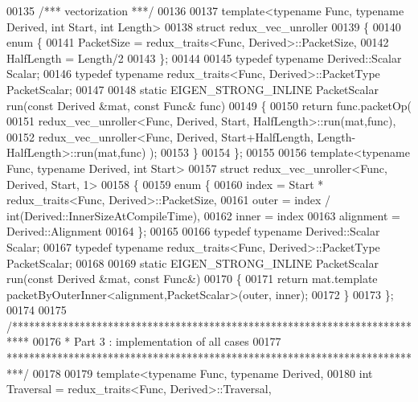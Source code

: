 \begin{DoxyCode}
00135 \textcolor{comment}{/*** vectorization ***/}
00136 
00137 \textcolor{keyword}{template}<\textcolor{keyword}{typename} Func, \textcolor{keyword}{typename} Derived, \textcolor{keywordtype}{int} Start, \textcolor{keywordtype}{int} Length>
00138 \textcolor{keyword}{struct }redux\_vec\_unroller
00139 \{
00140   \textcolor{keyword}{enum} \{
00141     PacketSize = redux\_traits<Func, Derived>::PacketSize,
00142     HalfLength = Length/2
00143   \};
00144 
00145   \textcolor{keyword}{typedef} \textcolor{keyword}{typename} Derived::Scalar Scalar;
00146   \textcolor{keyword}{typedef} \textcolor{keyword}{typename} redux\_traits<Func, Derived>::PacketType PacketScalar;
00147 
00148   \textcolor{keyword}{static} EIGEN\_STRONG\_INLINE PacketScalar run(\textcolor{keyword}{const} Derived &mat, \textcolor{keyword}{const} Func& func)
00149   \{
00150     \textcolor{keywordflow}{return} func.packetOp(
00151             redux\_vec\_unroller<Func, Derived, Start, HalfLength>::run(mat,func),
00152             redux\_vec\_unroller<Func, Derived, Start+HalfLength, Length-HalfLength>::run(mat,func) );
00153   \}
00154 \};
00155 
00156 \textcolor{keyword}{template}<\textcolor{keyword}{typename} Func, \textcolor{keyword}{typename} Derived, \textcolor{keywordtype}{int} Start>
00157 \textcolor{keyword}{struct }redux\_vec\_unroller<Func, Derived, Start, 1>
00158 \{
00159   \textcolor{keyword}{enum} \{
00160     index = Start * redux\_traits<Func, Derived>::PacketSize,
00161     outer = index / int(Derived::InnerSizeAtCompileTime),
00162     inner = index %
00163     alignment = Derived::Alignment
00164   \};
00165 
00166   \textcolor{keyword}{typedef} \textcolor{keyword}{typename} Derived::Scalar Scalar;
00167   \textcolor{keyword}{typedef} \textcolor{keyword}{typename} redux\_traits<Func, Derived>::PacketType PacketScalar;
00168 
00169   \textcolor{keyword}{static} EIGEN\_STRONG\_INLINE PacketScalar run(\textcolor{keyword}{const} Derived &mat, \textcolor{keyword}{const} Func&)
00170   \{
00171     \textcolor{keywordflow}{return} mat.template packetByOuterInner<alignment,PacketScalar>(outer, inner);
00172   \}
00173 \};
00174 
00175 \textcolor{comment}{/***************************************************************************}
00176 \textcolor{comment}{* Part 3 : implementation of all cases}
00177 \textcolor{comment}{***************************************************************************/}
00178 
00179 \textcolor{keyword}{template}<\textcolor{keyword}{typename} Func, \textcolor{keyword}{typename} Derived,
00180          \textcolor{keywordtype}{int} Traversal = redux\_traits<Func, Derived>::Traversal,

\end{DoxyCode}
